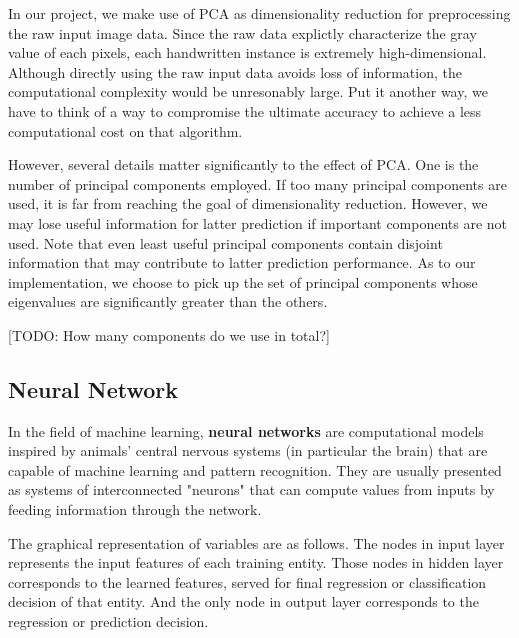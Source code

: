\documentclass{article} %
\begin{document}
In our project, we make use of PCA as dimensionality reduction for preprocessing the raw input image data.
Since the raw data explictly characterize the gray value of each pixels, each
handwritten instance is extremely high-dimensional. Although directly using
the raw input data avoids loss of information, the computational complexity
would be unresonably large. Put it another way, we have to think of a way to
compromise the ultimate accuracy to achieve a less computational cost on that
algorithm.

However, several details matter significantly to the effect of PCA. One is the number
of principal components employed. If too many principal components are used,
it is far from reaching the goal of dimensionality reduction. However, we may
lose useful information for latter prediction if important components are not
used. Note that even least useful principal components contain disjoint information
that may contribute to latter prediction performance. As to our
implementation, we choose to pick up the set of principal components whose
eigenvalues are significantly greater than the others. 

{\large [TODO: How many components do we use in total?]}


\subsection{Neural Network}
In the field of machine learning, {\bf neural networks} are computational models
inspired by animals' central nervous systems (in particular the brain) that
are capable of machine learning and pattern recognition. They are usually
presented as systems of interconnected "neurons" that can compute values from
inputs by feeding information through the network.

The graphical representation of variables are as follows. The nodes in input
layer represents the input features of each training entity. Those nodes in
hidden layer corresponds to the learned features, served for final regression
or classification decision of that entity. And the only node in output layer
corresponds to the regression or prediction decision.
\end{document}
